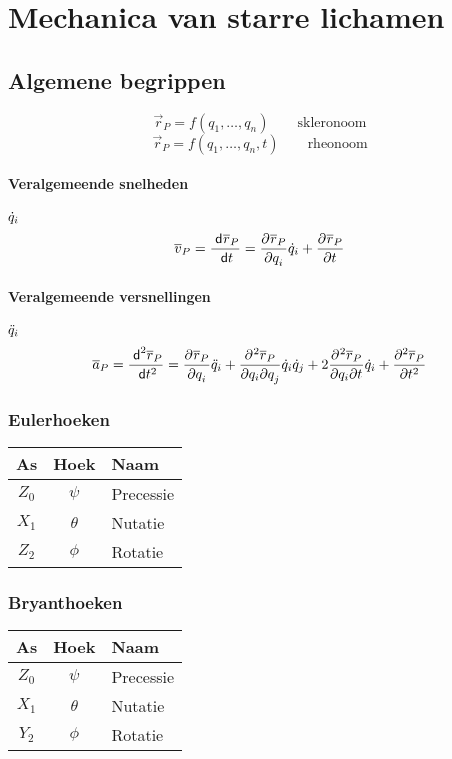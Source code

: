 \section{Mechanica van starre lichamen}

\subsection{Algemene begrippen}

\[
  \vec{r}_P = f\left(q_1, \ldots, q_n\right) \qquad \mbox{skleronoom}
\]
\[
  \vec{r}_P = f\left(q_1, \ldots, q_n, t\right) \qquad \mbox{rheonoom}
\]

\paragraph{Veralgemeende snelheden} $\dt{q}_i$
\[
  \vec{v}_P = \diff{\vec{r}_P}{t} = \pdiff{\vec{r}_P}{q_i} \dt{q}_i + \pdiff{\vec{r}_P}{t}
\]
\paragraph{Veralgemeende versnellingen} $\dtt{q}_i$
\[
  \vec{a}_P = \diff[2]{\vec{r}_P}{t} = \pdiff{\vec{r}_P}{q_i}\dtt{q}_i + \pdiff{^2\vec{r}_P}{q_i \pd{q_j}}\dt{q}_i \dt{q}_j + 2 \pdiff{^2 \vec{r}_P}{q_i \pd{t}} \dt{q}_i + \pdiff[2]{\vec{r}_P}{t}
\]

  \subsubsection{Eulerhoeken}
  \begin{tabular}{|c|c|l|}
    \hline
     \textbf{As} & \textbf{Hoek} & \textbf{Naam} \\
    \hline
    $Z_0$  & $\psi$   & Precessie\\
    $X_1$  & $\theta$ & Nutatie\\
    $Z_2$  & $\phi$   & Rotatie\\
    \hline
  \end{tabular}


  \subsubsection{Bryanthoeken}
  \begin{tabular}{|c|c|l|}
    \hline
     \textbf{As} & \textbf{Hoek} & \textbf{Naam} \\
    \hline
    $Z_0$  & $\psi$   & Precessie\\
    $X_1$  & $\theta$ & Nutatie\\
    $Y_2$  & $\phi$   & Rotatie\\
    \hline
  \end{tabular}


